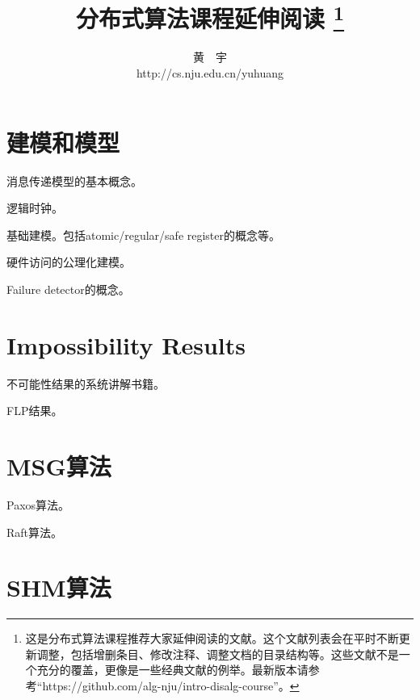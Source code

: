 \documentclass[UTF8]{ctexrep}
\begin{document}
\title{\bf \huge 分布式算法课程延伸阅读 \footnote{这是分布式算法课程推荐大家延伸阅读的文献。这个文献列表会在平时不断更新调整，包括增删条目、修改注释、调整文档的目录结构等。这些文献不是一个充分的覆盖，更像是一些经典文献的例举。最新版本请参考“https://github.com/alg-nju/intro-disalg-course”。}}

\author{黄\ \ 宇 \\ http://cs.nju.edu.cn/yuhuang}

\date{}
\maketitle

\tableofcontents


\chapter{建模和模型}

\cite{Lamport78} 消息传递模型的基本概念。

\cite{Mattern89} 逻辑时钟。

\cite{Lamport86a, Lamport86b} 基础建模。包括atomic/regular/safe register的概念等。

\cite{Misra86} 硬件访问的公理化建模。

\cite{Chandra96} Failure detector的概念。

\chapter{Impossibility Results}

\cite{Attiya14} 不可能性结果的系统讲解书籍。

\cite{Fischer85} FLP结果。

\chapter{MSG算法}

\cite{Lamport01} Paxos算法。

\cite{Ongaro14} Raft算法。

\chapter{SHM算法}
\end{document}

